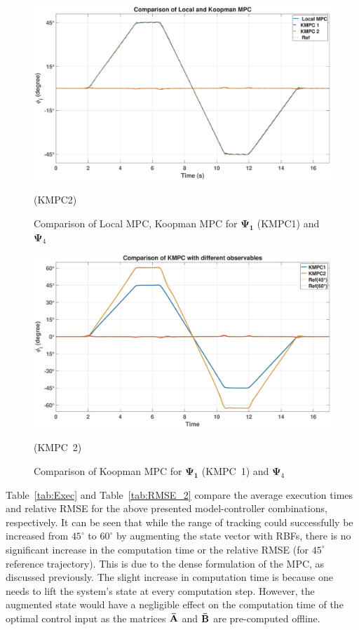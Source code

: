 \begin{figure}[H]
    \centering
    \includegraphics[width=1\linewidth]{figures/LocalKMPC12_5ms}
    \caption{Comparison of Local MPC, Koopman MPC for $\mathbf{\Psi_1}$ (KMPC1) and $\mathbf{\Psi}_4$} (KMPC2)
    \label{fig: LocalKMPC12}
\end{figure}
% 
% 
\begin{figure}[H]
    \centering
    \includegraphics[width=1\linewidth]{figures/KMPC_comp_5ms}
    \caption{Comparison of Koopman MPC for $\mathbf{\Psi_1}$ (KMPC~1) and $\mathbf{\Psi}_4$} (KMPC~2)
    \label{fig: KPMC_comp}
\end{figure}
% 
Table~\ref{tab:Exec} and Table~\ref{tab:RMSE_2} compare the average execution times and relative RMSE for the above presented model-controller combinations, respectively. It can be seen that while the range of tracking could successfully be increased from $45^\circ$ to $60^\circ$ by augmenting the state vector with RBFs, there is no significant increase in the computation time or the relative RMSE (for $45^\circ$ reference trajectory). This is due to the dense formulation of the MPC, as discussed previously. The slight increase in computation time is because one needs to lift the system's state at every computation step. However, the augmented state would have a negligible effect on the computation time of the optimal control input as the matrices $\mathbf{\Bar{A}}$ and $\mathbf{\Bar{B}}$ are pre-computed offline. \par

